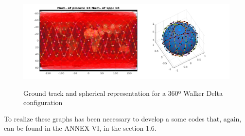 \begin{figure}[H] %
	\centering
	\includegraphics[width=1\textwidth]{./testing/WB360.png}\\
	\caption{Ground track and spherical representation for a 360º Walker Delta configuration}
	\label{fig:graph120}
\end{figure}

To realize these graphs has been necessary to develop a some codes that, again, can be found in the ANNEX VI, in the section 1.6.